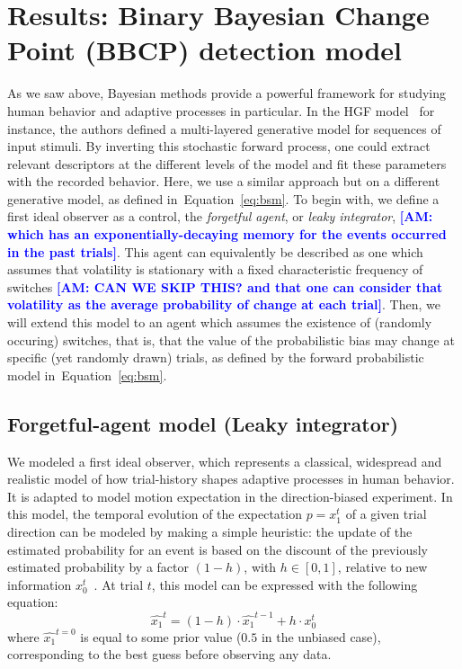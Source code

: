 \documentclass[12pt,english]{article}%
\newcommand{\eql}[1]{\begin{equation}#1\end{equation}}
\newcommand{\citep}[1]{\parencite{#1}}
\newcommand{\seeEq}[1]{Equation~\ref{eq:#1}}
\newcommand{\AM}[1]{\textbf{\textcolor{blue}{[AM: #1]}}}
\begin{document}
\section{Results: Binary Bayesian Change Point (BBCP) detection model}
\label{sec:bayesian_change_point}
%
%
As we saw above, Bayesian methods provide a powerful framework for studying human behavior and adaptive  processes in particular.
In the HGF model~\citep{Mathys11} for instance, the
authors defined a multi-layered generative model for
sequences of input stimuli.
By inverting this stochastic forward process,
one could extract relevant descriptors at the different levels of the model
and fit these parameters with the recorded behavior.
Here, we use a similar approach but on a different generative model,
as defined in~\seeEq{bsm}.
To begin with, we define a first ideal observer as a control, the \textit{forgetful agent}, or \textit{leaky integrator}, \AM{which has an exponentially-decaying memory for the events occurred in the past trials}. This agent can equivalently be described as one
which assumes that volatility is stationary with a fixed characteristic frequency of switches
\AM{CAN WE SKIP THIS? and that one can consider that volatility as the average probability of change at each trial}.
Then, we will extend this model to an agent
which assumes the existence of (randomly occuring) switches, that is,
that the value of the probabilistic bias may change
at specific (yet randomly drawn) trials,
as defined by the forward probabilistic model in~\seeEq{bsm}.
%
\subsection{Forgetful-agent model (Leaky integrator)}%
We modeled a first ideal observer,
which represents a classical, widespread and
realistic model of how trial-history shapes
adaptive processes in human behavior.
It is adapted to model motion expectation in the direction-biased experiment.
In this model, the temporal evolution of the expectation $p=x_1^t$ of a given trial direction can be modeled by making a simple heuristic:
the update of the estimated probability for an event is based
on the discount of the previously estimated probability
by a factor $(1 - h)$, with $h \in [0, 1]$, relative to new information $x_0^t$~\citep{Anderson2006}.
At trial $t$, this model can be expressed with the following equation:
\eql{
\hat{x_1}^{t} = (1 - h) \cdot \hat{x_1}^{t-1} + h \cdot x_0^t
\label{eq:leaky}}
where $\hat{x_1}^{t=0}$ is equal to some prior value ($0.5$ in the unbiased case),
corresponding to the best guess before observing any data.
\end{document}
